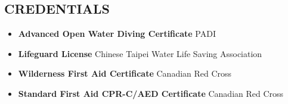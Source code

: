 \documentclass[11pt,letterpaper,sans]{moderncv}        %
\begin{document}
\subsection{CREDENTIALS}

\begin{itemize}
\item{\textbf{Advanced Open Water Diving Certificate} PADI}
\item{\textbf{Lifeguard License} Chinese Taipei Water Life Saving Association}
\item{\textbf{Wilderness First Aid Certificate} Canadian Red Cross}
\item{\textbf{Standard First Aid CPR-C/AED Certificate} Canadian Red Cross}
\end{itemize}
\end{document}
